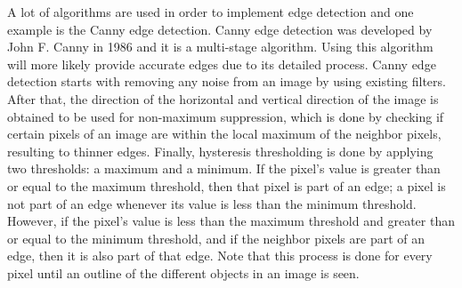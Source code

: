 \documentclass[journal]{./IEEE/IEEEtran}
\begin{document}
\newline
\indent A lot of algorithms are used in order to implement edge detection and one example is the Canny edge detection. Canny edge detection was developed by John F. Canny in 1986 and it is a multi-stage algorithm. Using this algorithm will more likely provide accurate edges due to its detailed process. Canny edge detection starts with removing any noise from an image by using existing filters. After that, the direction of the horizontal and vertical direction of the image is obtained to be used for non-maximum suppression, which is done by checking if certain pixels of an image are within the local maximum of the neighbor pixels, resulting to thinner edges. Finally, hysteresis thresholding is done by applying two thresholds: a maximum and a minimum. If the pixel's value is greater than or equal to the maximum threshold, then that pixel is part of an edge; a pixel is not part of an edge whenever its value is less than the minimum threshold. However, if the pixel's value is less than the maximum threshold and greater than or equal to the minimum threshold, and if the neighbor pixels are part of an edge, then it is also part of that edge. Note that this process is done for every pixel until an outline of the different objects in an image is seen.
\end{document}
